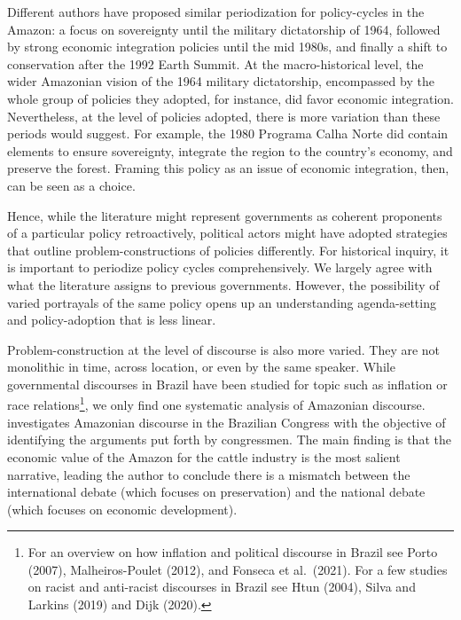 \documentclass[]{interact}
\theoremstyle{plain}%
\theoremstyle{definition}
\theoremstyle{remark}
\begin{document}
Different authors have proposed similar periodization for policy-cycles
in the Amazon: a focus on sovereignty until the military dictatorship of
1964, followed by strong economic integration policies until the mid
1980s, and finally a shift to conservation after the 1992 Earth Summit.
At the macro-historical level, the wider Amazonian vision of the 1964
military dictatorship, encompassed by the whole group of policies they
adopted, for instance, did favor economic integration. Nevertheless, at
the level of policies adopted, there is more variation than these
periods would suggest. For example, the 1980 Programa Calha Norte did
contain elements to ensure sovereignty, integrate the region to the
country's economy, and preserve the forest. Framing this policy as an
issue of economic integration, then, can be seen as a choice.

Hence, while the literature might represent governments as coherent
proponents of a particular policy retroactively, political actors might
have adopted strategies that outline problem-constructions of policies
differently. For historical inquiry, it is important to periodize policy
cycles comprehensively. We largely agree with what the literature
assigns to previous governments. However, the possibility of varied
portrayals of the same policy opens up an understanding agenda-setting
and policy-adoption that is less linear.

Problem-construction at the level of discourse is also more varied. They
are not monolithic in time, across location, or even by the same
speaker. While governmental discourses in Brazil have been studied for
topic such as inflation or race relations\footnote{For an overview on
  how inflation and political discourse in Brazil see Porto (2007),
  Malheiros-Poulet (2012), and Fonseca et al.~(2021). For a few studies
  on racist and anti-racist discourses in Brazil see Htun (2004), Silva
  and Larkins (2019) and Dijk (2020).}, we only find one systematic
analysis of Amazonian discourse. \citet{barros2020} investigates
Amazonian discourse in the Brazilian Congress with the objective of
identifying the arguments put forth by congressmen. The main finding is
that the economic value of the Amazon for the cattle industry is the
most salient narrative, leading the author to conclude there is a
mismatch between the international debate (which focuses on
preservation) and the national debate (which focuses on economic
development).
\end{document}
